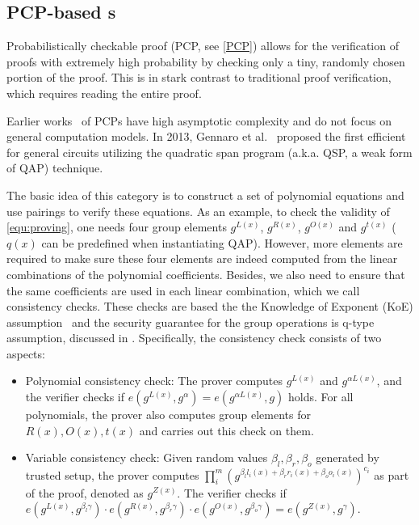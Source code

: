 \documentclass[letterpaper,twocolumn,10pt]{article}
\theoremstyle{definition}
\newcommand{\zk}{\text{zk-SNARK}\xspace}
\newcommand{\new}[1]{{#1}\xspace}
\begin{document}
\subsection{PCP-based {\zk}s}
\label{sec:4.1}
\new{Probabilistically checkable proof (PCP, see \autoref{PCP}) allows for the verification of proofs with extremely high probability by checking only a tiny, randomly chosen portion of the proof. This is in stark contrast to traditional proof verification, which requires reading the entire proof.}

Earlier works~\cite{kilian1992note,groth2010short} of PCPs have high asymptotic complexity and do not focus on general computation models. In 2013, Gennaro et al.~\cite{gennaro2013quadratic} proposed the first efficient {\zk} for general circuits utilizing the quadratic span program (a.k.a. QSP, a weak form of QAP) technique. \new{The basic idea of this category is to construct a set of polynomial equations and use pairings to verify these equations. As an example, to check the validity of \autoref{equ:proving}, one needs four group elements $g^{L(x)}$, $g^{R(x)}$, $g^{O(x)}$ and $g^{t(x)}$ ($q(x)$ can be predefined when instantiating QAP). However, more elements are required to make sure these four elements are indeed computed from the linear combinations of the polynomial coefficients. Besides, we also need to ensure that the same coefficients are used in each linear combination, which we call consistency checks. These checks are based the the Knowledge of Exponent (KoE) assumption~\cite{bellare2004knowledge} and the security guarantee for the group operations is q-type assumption, discussed in \cite{gennaro2013quadratic}. 
	Specifically, the consistency check consists of two aspects:
	\begin{itemize}[noitemsep, topsep=2pt, partopsep=0pt,leftmargin=0.4cm]
		\item Polynomial consistency check: The prover computes $g^{L(x)}$ and $g^{\alpha L(x)}$, and the verifier checks if $e(g^{L(x)},g^{\alpha})=e(g^{\alpha L(x)},g)$ holds. For all polynomials, the prover also computes group elements for $R(x),O(x),t(x)$ and carries out this check on them.
		\item Variable consistency check: Given random values $\beta_l,\beta_r,\beta_o$ generated by trusted setup, the prover computes $\prod_{i}^{m} (g^{\beta_{l}l_{i}(x)+\beta_{r}r_{i}(x)+\beta_{o}o_{i}(x)})^{c_{i}}$ as part of the proof, denoted as $g^{Z(x)}$. The verifier checks if $e(g^{L(x)},g^{\beta_{l}\gamma})\cdot e(g^{R(x)},g^{\beta_{r}\gamma})\cdot e(g^{O(x)},g^{\beta_{o}\gamma})=e(g^{Z(x)},g^{\gamma})$.
	\end{itemize}
}
\end{document}

